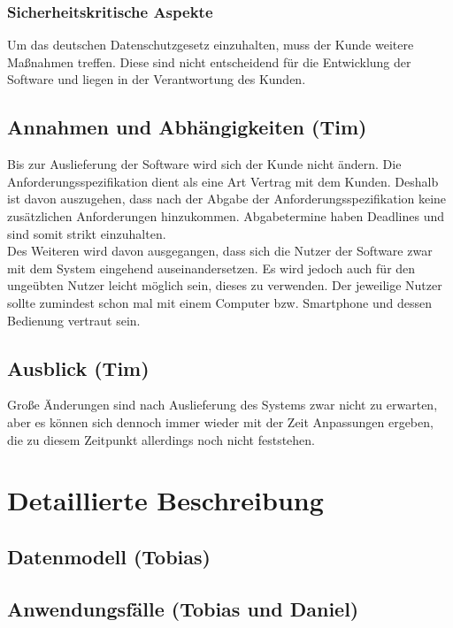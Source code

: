 \documentclass[fontsize=12pt,paper=a4,twoside]{scrartcl}
\begin{document}
\subsubsection{Sicherheitskritische Aspekte} \label{subsubsec:SicherheitsAspekte} Um das deutschen Datenschutzgesetz einzuhalten, muss der Kunde weitere Maßnahmen treffen. Diese sind nicht entscheidend für die Entwicklung der Software und liegen in der Verantwortung des Kunden.

\subsection{Annahmen und Abhängigkeiten (Tim)} \label{subsec:Annahmen} Bis zur Auslieferung der Software wird sich der Kunde nicht ändern. Die Anforderungsspezifikation dient als eine Art Vertrag mit dem Kunden. Deshalb ist davon auszugehen, dass nach der Abgabe der Anforderungsspezifikation keine zusätzlichen Anforderungen hinzukommen. Abgabetermine haben Deadlines und sind somit strikt einzuhalten.\\
Des Weiteren wird davon ausgegangen, dass sich die Nutzer der Software zwar mit dem System eingehend auseinandersetzen. Es wird jedoch auch für den ungeübten Nutzer leicht möglich sein, dieses zu verwenden. Der jeweilige Nutzer sollte zumindest schon mal mit einem Computer bzw. Smartphone und dessen Bedienung vertraut sein.\\


\subsection{Ausblick (Tim)} \label{subsec:Ausblick} Große Änderungen sind nach Auslieferung des Systems zwar nicht zu erwarten, aber es können sich dennoch immer wieder mit der Zeit Anpassungen ergeben, die zu diesem Zeitpunkt allerdings noch nicht feststehen.

\section{Detaillierte Beschreibung}
\label{ch:DetaillierteBeschreibung}


\subsection{Datenmodell (Tobias)}


\subsection{Anwendungsfälle (Tobias und Daniel)}
  
\end{document}
